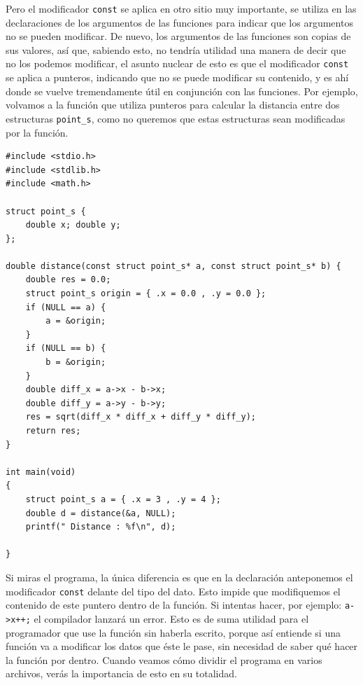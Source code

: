 \documentclass[a4paper]{article}
\begin{document}
Pero el modificador \verb!const! se aplica en otro sitio muy importante,
se utiliza en las declaraciones de los argumentos de las funciones para indicar
que los argumentos no se pueden modificar. De nuevo, los argumentos de las
funciones son copias de sus valores, así que, sabiendo esto, no tendría utilidad
una manera de decir que no los podemos modificar, el asunto nuclear de esto es
que el modificador \verb!const! se aplica a punteros, indicando que no se puede
modificar su contenido, y es ahí donde se vuelve tremendamente útil en
conjunción con las funciones. Por ejemplo, volvamos a la función que utiliza
punteros para calcular la distancia entre dos estructuras \verb!point_s!, como
no queremos que estas estructuras sean modificadas por la función.


\noindent
\begin{minipage}[H]{\linewidth}
\mbox{}
\begin{lstlisting}[style=C,
caption={Uso de punteros constantes como argumentos de función},
label={lst:constantArguments}]
#include <stdio.h>
#include <stdlib.h>
#include <math.h>

struct point_s {
    double x; double y;
};

double distance(const struct point_s* a, const struct point_s* b) {
    double res = 0.0;
    struct point_s origin = { .x = 0.0 , .y = 0.0 };
    if (NULL == a) {
        a = &origin;
    }
    if (NULL == b) {
        b = &origin;
    }
    double diff_x = a->x - b->x;
    double diff_y = a->y - b->y;
    res = sqrt(diff_x * diff_x + diff_y * diff_y);
    return res;
}

int main(void)
{
    struct point_s a = { .x = 3 , .y = 4 };
    double d = distance(&a, NULL);
    printf(" Distance : %f\n", d);

}
\end{lstlisting}
\end{minipage}

Si miras el programa, la única diferencia es que en la declaración anteponemos
el modificador \verb!const! delante del tipo del dato. Esto impide que
modifiquemos el contenido de este puntero dentro de la función. Si intentas
hacer, por ejemplo: \verb!a->x++;! el compilador lanzará un error. Esto es de
suma utilidad para el programador que use la función sin haberla escrito,
porque así entiende si una función va a modificar los datos que éste le pase,
sin necesidad de saber qué hacer la función por dentro. Cuando veamos cómo
dividir el programa en varios archivos, verás la importancia de esto en su
totalidad.
\end{document}

